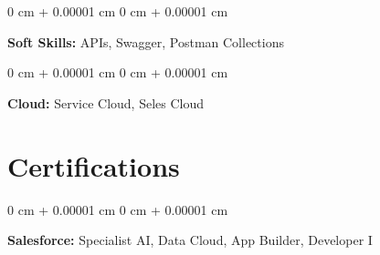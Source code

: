 \documentclass[10pt, letterpaper]{article}
\newenvironment{onecolentry}{
    \begin{adjustwidth}{
        0 cm + 0.00001 cm
    }{
        0 cm + 0.00001 cm
    }
}{
    \end{adjustwidth}
} %
\begin{document}
        \vspace{0.2 cm}   

               \begin{onecolentry}
            \textbf{Soft Skills:} APIs, Swagger, Postman Collections 
        \end{onecolentry}

        \vspace{0.2 cm}   
        
        \begin{onecolentry}
            \textbf{Cloud:} Service Cloud, Seles Cloud
        \end{onecolentry}


        \section{Certifications}



        
        \begin{onecolentry}
            \textbf{Salesforce:} Specialist AI, Data Cloud, App Builder, Developer I
        \end{onecolentry}

    

    
\end{document}
